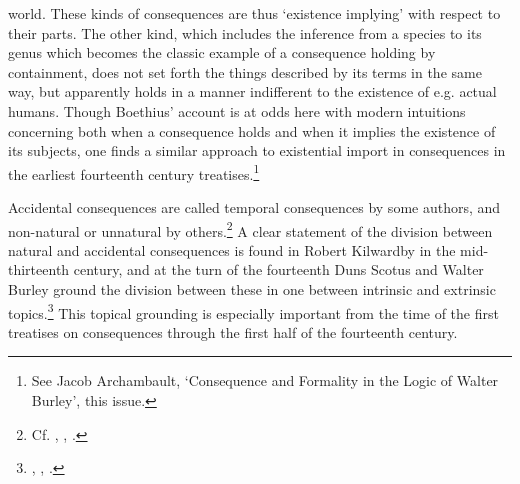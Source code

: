 \documentclass[]{article}
\begin{document}
world. These kinds of consequences are thus `existence implying' with respect to their parts. The other kind, which includes the inference from a species to its genus which becomes the classic example of a consequence holding by containment, does not set forth the things described by its terms in the same way, but apparently holds in a manner indifferent to the existence of e.g. actual humans. Though Boethius' account is at odds here with modern intuitions concerning both when a consequence holds and when it implies the existence of its subjects, one finds a similar approach to existential import in consequences in the earliest fourteenth century treatises.\footnote{See Jacob Archambault, `Consequence and Formality in the Logic of Walter Burley', this issue.}

Accidental consequences are called temporal consequences by some authors, and non-natural or unnatural by others.\footnote{Cf. \autocite[141]{Garlandus1959}, \autocite[p. 472]{AbelardDialectica}, \autocite[152]{SherwoodNewSyncategoremata} \autocite[vol. 2, pp. 199-200]{Braakhuis1979}.} A clear statement of the division between natural and accidental consequences is found in Robert Kilwardby in the mid-thirteenth century, and at the turn of the fourteenth Duns Scotus and Walter Burley ground the division between these in one between intrinsic and extrinsic topics.\footnote{\autocite[Part 2, 1, 55, p. 1140.79-83]{KilwardbyPriorum}, \autocite[I, d. 11, q. 2, pp. 136-137]{ScotusLectura}, \autocite[pp. 60.26-61.15]{BurleyDPAL}.} This topical grounding is especially important from the time of the first treatises on consequences through the first half of the fourteenth century.
\end{document}
